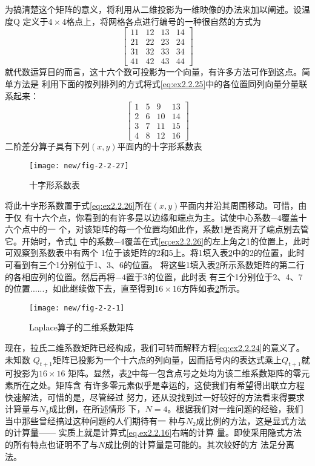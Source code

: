 为搞清楚这个矩阵的意义，将利用从二维投影为一维映像的办法来加以阐述。设温度Q
定义于$4\times 4$格点上，将网格各点进行编号的一种很自然的方式为
\begin{equation}
\begin{bmatrix}
11&12&13&14\\
21&22&23&24\\
31&32&33&34\\
41&42&43&44
\end{bmatrix}
\label{eq:ex2.2.25}
\end{equation}
就代数运算目的而言，这十六个数可投影为一个向量，有许多方法可作到这点。简单方法是
利用下面的按列排列的方式将式\ref{eq:ex2.2.25}中的各位置同列向量分量联系起来：
\begin{equation}
\begin{bmatrix}
1&5&9&13\\
2&6&10&14\\
3&7&11&15\\
4&8&12&16
\end{bmatrix}
\label{eq:ex2.2.26}
\end{equation}
二阶差分算子具有下列$(x,y)$平面内的十字形系数表
\begin{figure}[H]
\centering
\texttt{[image: new/fig-2-2-27]}
\caption[fig-2-2-27]{十字形系数表}
\label{fig:new/fig-2-2-27}
\end{figure}
将此十字形系数置于式\ref{eq:ex2.2.26}所在$(x,y)$平面内并沿其周围移动。可惜，由于仅
有十六个点，你看到的有许多是以边缘和端点为主。试使中心系数$-4$覆盖十六个点中的一
个，对该矩阵的每一个位置均如此作，系数1是否离开了端点别去管它。开始时，令式\ref{fig:new/fig-2-2-27}
中的系数$-4$覆盖在式\ref{eq:ex2.2.26}的左上角之1的位置上，此时可观察到系数表中有两个
1位于该矩阵的2和5上。将1填入表\ref{fig:new/fig-2-2-1}中的2的位置，此时可看到有三个1分别位于1、3、6的位置。
将这些1填入表\ref{fig:new/fig-2-2-1}所示系数矩阵的第二行的各相应列的位置。然后再将$-4$置于3的位置，此时表
有三个1分别位于2、4、7的位置......，如此继续做下去，直至得到$16\times 16$方阵如表\ref{fig:new/fig-2-2-1}所示。
\begin{figure}[H]
\centering
\texttt{[image: new/fig-2-2-1]}
\caption[fig-2-2-1]{Laplace算子的二维系数矩阵}
\label{fig:new/fig-2-2-1}
\end{figure}
现在，拉氏二维系数矩阵已经构成，我们可转而解释方程\ref{eq:ex2.2.24}的意义了。未知数
$Q_{t+1}$矩阵已投影为一个十六点的列向量，因而括号内的表达式乘上$Q_{t+1}$就可投影为$16\times 16$
矩阵。显然，表\ref{fig:new/fig-2-2-1}中每一包含点号之处均为该二维系数矩阵的零元素所在之处。矩阵含
有许多零元素似乎是幸运的，这使我们有希望得出联立方程快速解法，可惜的是，尽管经过
努力，还从没找到过一好较好的方法看来得要求计算量与$N_3$成比例，在所述情形
下，$N = 4$。根据我们对一维问题的经验，我们
当中那些曾经搞过这种问题的人们期待有一
种与$N_2$成比例的方法，这是显式方法的计算量——
实质上就是计算式\ref{eq.ex2.2.16}右端的计算
量。即使采用隐式方法的所有特点也证明不了与$N$成比例的计算量是可能的。其次较好的方
法足分离法。

